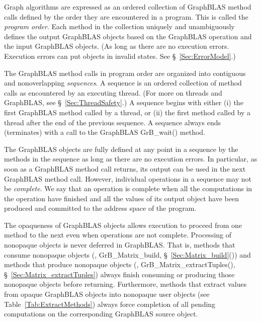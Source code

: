 Graph algorithms are expressed as an ordered collection of GraphBLAS
method calls defined by the order they are encountered in a program.
This is called the \emph{program order}.  Each method in the collection
uniquely and unambiguously defines the output GraphBLAS objects based
on the GraphBLAS operation and the input GraphBLAS objects. (As long
as there are no execution errors. Execution errors can put objects in
invalid states. See \S~\ref{Sec:ErrorModel}.)

The GraphBLAS method calls in program order are organized into 
contiguous and nonoverlapping \emph{sequences}.  A sequence is an
ordered collection of method calls as encountered by an executing thread. (For more
on threads and GraphBLAS, see \S~\ref{Sec:ThreadSafety}.)  A sequence
begins with either (i) the first GraphBLAS method called by a thread, or
(ii) the first method called by a thread after the end of the previous
sequence. A sequence always ends (terminates) with a call to the GraphBLAS
{\sf GrB\_wait()} method.

The GraphBLAS objects are fully defined at any point in a sequence by the
methods in the sequence as long as there are no execution errors.
In particular, as soon as a GraphBLAS
method call returns, its output can be used in the next GraphBLAS
method call.  However, individual operations in a sequence may not
be \emph{complete}. We say that an operation is complete when all the
computations in the operation have finished and all the values of its
output object have been produced and committed to the address 
space of the program.

The opaqueness of GraphBLAS objects allows execution to proceed
from one method to the next even when operations are not complete.
Processing of nonopaque objects is never deferred in GraphBLAS. That is,
methods that consume nonopaque objects (\eg, {\sf GrB\_Matrix\_build},
\S~\ref{Sec:Matrix_build}()) and methods that produce nonopaque objects (\eg,
{\sf GrB\_Matrix\_extractTuples()}, \S~\ref{Sec:Matrix_extractTuples})
always finish consuming or producing those nonopaque objects before
returning.   Furthermore, methods that extract values from opaque GraphBLAS objects
into nonopaque user objects (see Table~\ref{Tab:ExtractMethods})
always force completion of all pending computations on the 
corresponding GraphBLAS source object.

